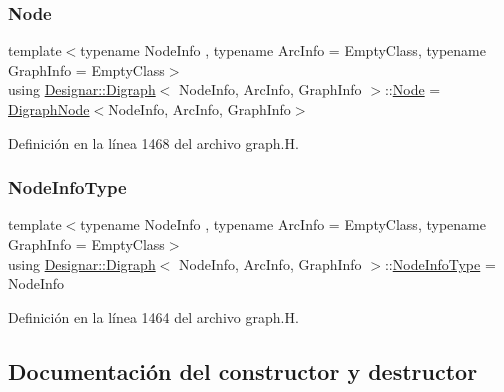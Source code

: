 \subsubsection{\texorpdfstring{Node}{Node}}
{\footnotesize\ttfamily template$<$typename Node\+Info , typename Arc\+Info  = Empty\+Class, typename Graph\+Info  = Empty\+Class$>$ \\
using \hyperlink{class_designar_1_1_digraph}{Designar\+::\+Digraph}$<$ Node\+Info, Arc\+Info, Graph\+Info $>$\+::\hyperlink{class_designar_1_1_digraph_a4dc921c41a480b7946a04170e997d8ae}{Node} =  \hyperlink{class_designar_1_1_digraph_node}{Digraph\+Node}$<$Node\+Info, Arc\+Info, Graph\+Info$>$}



Definición en la línea 1468 del archivo graph.\+H.

\mbox{\label{class_designar_1_1_digraph_a6438608ff27cb6f017705e18bd7fc478}} 
\subsubsection{\texorpdfstring{Node\+Info\+Type}{NodeInfoType}}
{\footnotesize\ttfamily template$<$typename Node\+Info , typename Arc\+Info  = Empty\+Class, typename Graph\+Info  = Empty\+Class$>$ \\
using \hyperlink{class_designar_1_1_digraph}{Designar\+::\+Digraph}$<$ Node\+Info, Arc\+Info, Graph\+Info $>$\+::\hyperlink{class_designar_1_1_digraph_a6438608ff27cb6f017705e18bd7fc478}{Node\+Info\+Type} =  Node\+Info}



Definición en la línea 1464 del archivo graph.\+H.



\subsection{Documentación del constructor y destructor}
\mbox{\label{class_designar_1_1_digraph_ae57ac8513bfcb29602cc08a3d4bc7485}} 
